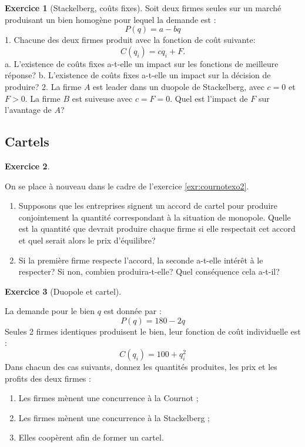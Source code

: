 \documentclass[
]{book}
\providecommand{\tightlist}{%
  \setlength{\itemsep}{0pt}\setlength{\parskip}{0pt}}
\theoremstyle{definition}
\theoremstyle{definition}
\theoremstyle{definition}
\newtheorem{exercise}{Exercice}[chapter]
\theoremstyle{definition}
\theoremstyle{remark}
\begin{document}
\begin{exercise}[Stackelberg, coûts fixes]
\protect\hypertarget{exr:stackexo2}{}\label{exr:stackexo2}Soit deux firmes seules sur un marché produisant un bien homogène pour lequel la demande est :
\[P\left(q\right)=a-bq\]
1. Chacune des deux firmes produit avec la fonction de coût suivante:
\[C(q_i)=cq_i+F.\]
a. L'existence de coûts fixes a-t-elle un impact sur les fonctions de meilleure réponse?
b. L'existence de coûts fixes a-t-elle un impact sur la décision de produire?
2. La firme \(A\) est leader dans un duopole de Stackelberg, avec \(c=0\) et \(F>0\). La firme \(B\) est suiveuse avec \(c=F=0\). Quel est l'impact de \(F\) sur l'avantage de \(A\)?
\end{exercise}

\hypertarget{cartels}{%
\subsection{Cartels}\label{cartels}}

\begin{exercise}
\protect\hypertarget{exr:cartelexo1}{}\label{exr:cartelexo1}

On se place à nouveau dans le cadre de l'exercice \ref{exr:cournotexo2}.

\begin{enumerate}
\def\labelenumi{\arabic{enumi}.}
\tightlist
\item
  Supposons que les entreprises signent un accord de cartel pour produire conjointement la quantité correspondant à la situation de monopole. Quelle est la quantité que devrait produire chaque firme si elle respectait cet accord et quel serait alors le prix d'équilibre?
\item
  Si la première firme respecte l'accord, la seconde a-t-elle intérêt à le respecter? Si non, combien produira-t-elle? Quel conséquence cela a-t-il?
\end{enumerate}

\end{exercise}

\begin{exercise}[Duopole et cartel]
\protect\hypertarget{exr:cartelexo2}{}\label{exr:cartelexo2}

La demande pour le bien \(q\) est donnée par : \[P(q)=180-2q\]
Seules 2 firmes identiques produisent le bien, leur fonction de coût
individuelle est : \[C(q_{i})=100+q_{i}^2\] Dans chacun des cas
suivants, donnez les quantités produites, les prix et les profits
des deux firmes :

\begin{enumerate}
\def\labelenumi{\arabic{enumi}.}
\tightlist
\item
  Les firmes mènent une concurrence à la Cournot ;
\item
  Les firmes mènent une concurrence à la Stackelberg ;
\item
  Elles coopèrent afin de former un cartel.
\end{enumerate}

\end{exercise}
\end{document}

